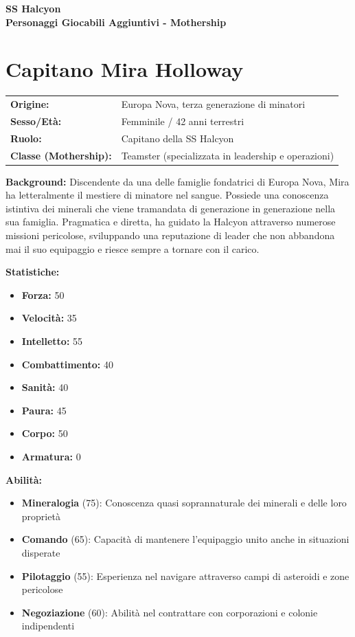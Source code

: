 \documentclass[11pt,a4paper]{article}
\begin{document}
\begin{center}
\Huge\textbf{\textcolor{miningorange}{SS Halcyon}}\\[0.5cm]
\Large\textbf{Personaggi Giocabili Aggiuntivi - Mothership}
\end{center}


\section{Capitano Mira Holloway}

\begin{tcolorbox}[colback=mininglightorange!20, colframe=miningorange]
\begin{tabularx}{\textwidth}{lX}
\textbf{Origine:} & Europa Nova, terza generazione di minatori \\
\textbf{Sesso/Età:} & Femminile / 42 anni terrestri \\
\textbf{Ruolo:} & Capitano della SS Halcyon \\
\textbf{Classe (Mothership):} & Teamster (specializzata in leadership e operazioni) \\
\end{tabularx}

\textbf{Background:} Discendente da una delle famiglie fondatrici di Europa Nova, Mira ha letteralmente il mestiere di minatore nel sangue. Possiede una conoscenza istintiva dei minerali che viene tramandata di generazione in generazione nella sua famiglia. Pragmatica e diretta, ha guidato la Halcyon attraverso numerose missioni pericolose, sviluppando una reputazione di leader che non abbandona mai il suo equipaggio e riesce sempre a tornare con il carico.

\textbf{Statistiche:}
\begin{itemize}[leftmargin=*]
\item \textbf{Forza:} 50
\item \textbf{Velocità:} 35
\item \textbf{Intelletto:} 55
\item \textbf{Combattimento:} 40
\item \textbf{Sanità:} 40
\item \textbf{Paura:} 45
\item \textbf{Corpo:} 50
\item \textbf{Armatura:} 0
\end{itemize}

\textbf{Abilità:}
\begin{itemize}[leftmargin=*]
\item \textbf{Mineralogia} (75): Conoscenza quasi soprannaturale dei minerali e delle loro proprietà
\item \textbf{Comando} (65): Capacità di mantenere l'equipaggio unito anche in situazioni disperate
\item \textbf{Pilotaggio} (55): Esperienza nel navigare attraverso campi di asteroidi e zone pericolose
\item \textbf{Negoziazione} (60): Abilità nel contrattare con corporazioni e colonie indipendenti
\end{itemize}


\end{tcolorbox}
\end{document}
